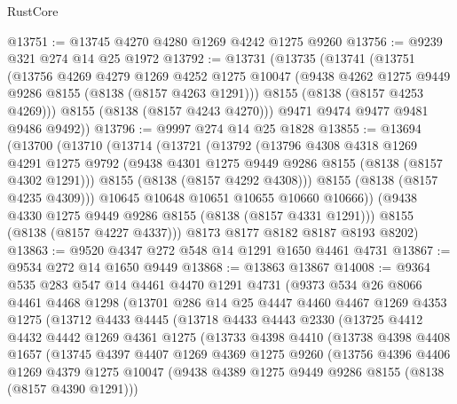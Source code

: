 \begin{lexlean}{RustCore}
\begin{coremodule}
@13751 := @13745 @4270 @4280 @1269 @4242 @1275 @9260
@13756 := @9239 @321 @274 @14 @25 @1972
@13792 := @13731
    (@13735
      (@13741
        (@13751
          (@13756
            @4269
            @4279
            @1269
            @4252
            @1275
            @10047
            (@9438 @4262 @1275 @9449 @9286 @8155 (@8138 (@8157 @4263 @1291)))
            @8155
            (@8138 (@8157 @4253 @4269)))
          @8155
          (@8138 (@8157 @4243 @4270)))
        @9471
        @9474
        @9477
        @9481
        @9486
        @9492))
@13796 := @9997 @274 @14 @25 @1828
@13855 := @13694
    (@13700
      (@13710
        (@13714
          (@13721
            (@13792
              (@13796
                @4308
                @4318
                @1269
                @4291
                @1275
                @9792
                (@9438 @4301 @1275 @9449 @9286 @8155 (@8138 (@8157 @4302 @1291)))
                @8155
                (@8138 (@8157 @4292 @4308)))
              @8155
              (@8138 (@8157 @4235 @4309)))
            @10645
            @10648
            @10651
            @10655
            @10660
            @10666))
        (@9438 @4330 @1275 @9449 @9286 @8155 (@8138 (@8157 @4331 @1291)))
        @8155
        (@8138 (@8157 @4227 @4337)))
      @8173
      @8177
      @8182
      @8187
      @8193
      @8202)
@13863 := @9520 @4347 @272 @548 @14 @1291 @1650 @4461 @4731
@13867 := @9534 @272 @14 @1650 @9449
@13868 := @13863 @13867
@14008 := @9364
    @535
    @283
    @547
    @14
    @4461
    @4470
    @1291
    @4731
    (@9373
      @534
      @26
      @8066
      @4461
      @4468
      @1298
      (@13701
        @286
        @14
        @25
        @4447
        @4460
        @4467
        @1269
        @4353
        @1275
        (@13712
          @4433
          @4445
          (@13718
            @4433
            @4443
            @2330
            (@13725
              @4412
              @4432
              @4442
              @1269
              @4361
              @1275
              (@13733
                @4398
                @4410
                (@13738
                  @4398
                  @4408
                  @1657
                  (@13745
                    @4397
                    @4407
                    @1269
                    @4369
                    @1275
                    @9260
                    (@13756
                      @4396
                      @4406
                      @1269
                      @4379
                      @1275
                      @10047
                      (@9438 @4389 @1275 @9449 @9286 @8155 (@8138 (@8157 @4390 @1291)))

\end{coremodule}
\end{lexlean}
